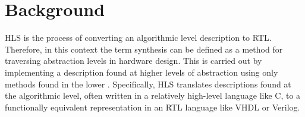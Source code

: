\documentclass[11pt,journal,compsoc, onecolumn]{IEEEtran}
\begin{document}
\section{Background}\label{sec:background}

HLS is the process of converting an algorithmic level description to RTL. Therefore, in this context the term synthesis can be defined as a method for traversing abstraction levels in hardware design. This is carried out by implementing a description found at higher levels of abstraction using only methods found in the lower \cite{churtl}. Specifically, HLS translates descriptions found at the algorithmic level, often written in a relatively high-level language like C, to a functionally equivalent representation in an RTL language like VHDL or Verilog.
\end{document}
